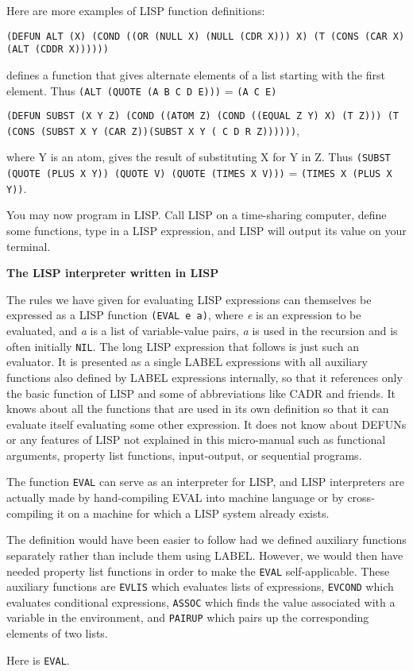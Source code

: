 \documentclass[8pt,letter,twocolumn]{article}
\begin{document}
Here are more examples of LISP function definitions:

\texttt{(DEFUN ALT (X) (COND ((OR (NULL X) (NULL (CDR X))) X) (T (CONS (CAR X)
  (ALT (CDDR X))))))}

defines a function that gives alternate elements of a list starting with the
first element. Thus \texttt{(ALT (QUOTE (A B C D E)))} = \texttt{(A C E)}

\texttt{(DEFUN SUBST (X Y Z) (COND ((ATOM Z) (COND ((EQUAL Z Y) X) (T Z))) (T
  (CONS (SUBST X Y (CAR Z))(SUBST X Y ( C D R Z))))))},

where Y is an atom, gives the result of substituting X for Y in Z. Thus
\texttt{(SUBST (QUOTE (PLUS X Y)) (QUOTE V) (QUOTE (TIMES X V)))} =
\texttt{(TIMES X (PLUS X Y))}.

You may now program in LISP. Call LISP on a time-sharing computer, define some
functions, type in a LISP expression, and LISP will output its value on your
terminal.

\vspace*{1\baselineskip}
\textbf{The LISP interpreter written in LISP}
\vspace*{1\baselineskip}

The rules we have given for evaluating LISP expressions can themselves be
expressed as a LISP function \texttt{(EVAL e a)}, where \textit{e} is an
expression to be evaluated, and \textit{a} is a list of variable-value pairs,
\textit{a} is used in the recursion and is often initially \texttt{NIL}. The
long LISP expression that follows is just such an evaluator. It is presented as
a single LABEL expressions with all auxiliary functions also defined by LABEL
expressions internally, so that it references only the basic function of LISP
and some of abbreviations like CADR and friends. It knows about all the
functions that are used in its own definition so that it can evaluate itself
evaluating some other expression. It does not know about DEFUNs or any features
of LISP not explained in this micro-manual such as functional arguments,
property list functions, input-output, or sequential programs.

The function \texttt{EVAL} can serve as an interpreter for LISP, and LISP
interpreters are actually made by hand-compiling EVAL into machine language or
by cross-compiling it on a machine for which a LISP system already exists.

The definition would have been easier to follow had we defined auxiliary
functions separately rather than include them using LABEL. However, we would
then have needed property list functions in order to make the \texttt{EVAL}
self-applicable. These auxiliary functions are \texttt{EVLIS} which evaluates
lists of expressions, \texttt{EVCOND} which evaluates conditional expressions,
\texttt{ASSOC} which finds the value associated with a variable in the
environment, and \texttt{PAIRUP} which pairs up the corresponding elements of
two lists.

\newpage
Here is \texttt{EVAL}.

\end{document}
